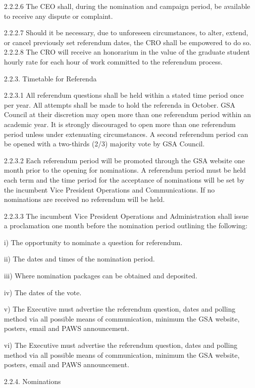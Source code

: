  2.2.2.6 The CEO shall, during the nomination and campaign period, be 
 available to receive any dispute or complaint. 
 
 2.2.2.7 Should it be necessary, due to unforeseen circumstances, to alter, 
 extend, or cancel previously set referendum dates, the CRO shall 
 be empowered to do so. 
 2.2.2.8 The CRO will receive an honorarium in the value of the graduate 
 student hourly rate for each hour of work committed to the 
 referendum process. 
 
 2.2.3. Timetable for Referenda 
 
 2.2.3.1 All referendum questions shall be held within a stated time period 
 once per year. All attempts shall be made to hold the referenda in 
 October. GSA Council at their discretion may open more than one 
 referendum period within an academic year. It is strongly 
 discouraged to open more than one referendum period unless 
 under extenuating circumstances. A second referendum period 
 can be opened with a two-thirds (2/3) majority vote by GSA 
 Council. 

 2.2.3.2 Each referendum period will be promoted through the GSA 
 website one month prior to the opening for nominations. A 
 referendum period must be held each term and the time period for 
 the acceptance of nominations will be set by the incumbent Vice 
 President Operations and Communications. If no nominations are 
 received no referendum will be held. 
 
 2.2.3.3 The incumbent Vice President Operations and Administration 
 shall issue a proclamation one month before the nomination 
 period outlining the following: 
 
 i) The opportunity to nominate a question for referendum. 
 
 ii) The dates and times of the nomination period. 
 
 iii) Where nomination packages can be obtained and 
 deposited. 
 
 iv) The dates of the vote. 
 
 v) The Executive must advertise the referendum question, 
 dates and polling method via all possible means of 
 communication, minimum the GSA website, posters, 
 email and PAWS announcement. 
 
 vi) The Executive must advertise the referendum question, 
 dates and polling method via all possible means of 
 communication, minimum the GSA website, posters, 
 email and PAWS announcement. 
 
 2.2.4. Nominations 
 
